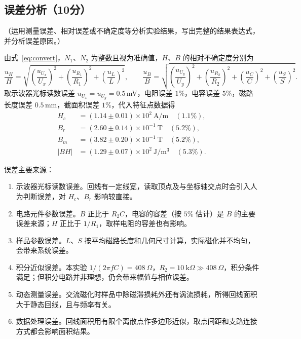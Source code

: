 \documentclass{Phyport}
\begin{document}
\subsection{误差分析（10分）}
（运用测量误差、相对误差或不确定度等分析实验结果，写出完整的结果表达式，并分析误差原因。）

由式~\eqref{eq:convert}，$N_1$、$N_2$ 为整数且视为准确值，$H$、$B$ 的相对不确定度分别为
\begin{equation*}
    \frac{u_H}{H}=\sqrt{\left(\frac{u_{U_x}}{U_x}\right)^2+\left(\frac{u_{R_1}}{R_1}\right)^2+\left(\frac{u_L}{L}\right)^2},\qquad
    \frac{u_B}{B}=\sqrt{\left(\frac{u_{U_y}}{U_y}\right)^2+\left(\frac{u_{R_2}}{R_2}\right)^2+\left(\frac{u_C}{C}\right)^2+\left(\frac{u_S}{S}\right)^2}.
\end{equation*}
取示波器光标读数误差 $u_{U_x}=u_{U_y}=0.5$\,mV，电阻误差 $1\%$，电容误差 $5\%$，磁路长度误差 $0.5$\,mm，截面积误差 $1\%$，代入特征点数据得
\begin{align*}
    H_c &= (1.14\pm0.01)\times10^{2}\ \mathrm{A/m}\quad(1.1\%),\\
    B_r &= (2.60\pm0.14)\times10^{-1}\ \mathrm{T}\quad(5.2\%),\\
    B_m &= (3.82\pm0.20)\times10^{-1}\ \mathrm{T}\quad(5.2\%),\\
    |BH| &= (1.29\pm0.07)\times10^{2}\ \mathrm{J/m^3}\quad(5.3\%).
\end{align*}

误差主要来源：
\begin{enumerate}
    \item 示波器光标读数误差。回线有一定线宽，读取顶点及与坐标轴交点时会引入人为判断误差，对 $H_c$、$B_r$ 影响较直接。
    \item 电路元件参数误差。$B$ 正比于 $R_2C$，电容的容差（按 $5\%$ 估计）是 $B$ 的主要误差来源；$H$ 正比于 $1/R_1$，取样电阻的容差也有影响。
    \item 样品参数误差。$L$、$S$ 按平均磁路长度和几何尺寸计算，实际磁化并不均匀，会带来系统误差。
    \item 积分近似误差。本实验 $1/(2\pi fC)=408\ \Omega$，$R_2=10\ \mathrm{k}\Omega\gg 408\ \Omega$，积分条件满足；但积分电路并非理想，仍会带来幅值与相位误差。
    \item 动态测量误差。交流磁化时样品中除磁滞损耗外还有涡流损耗，所得回线面积大于静态回线，且与频率有关。
    \item 数据处理误差。回线面积用有限个离散点作多边形近似，取点间距和支路连接方式都会影响面积结果。
\end{enumerate}
\end{document}

